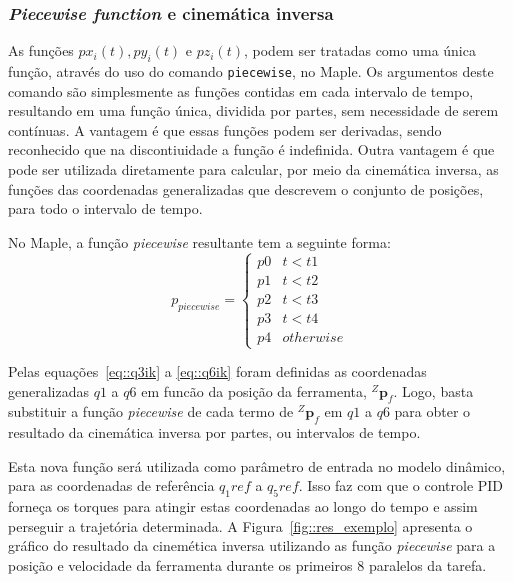 \subsubsection{\textit{Piecewise function} e cinemática inversa}

As funções $px_i(t), py_i(t)$ e $pz_i(t)$, podem ser tratadas como uma única
função, através do uso do comando \texttt{piecewise}, no Maple. Os argumentos
deste comando são simplesmente as funções contidas em cada intervalo de tempo,
resultando em uma função única, dividida por partes, sem necessidade de serem
contínuas. A vantagem é que essas funções podem ser derivadas, sendo reconhecido
que na discontiuidade a função é indefinida.
Outra vantagem é que pode ser utilizada diretamente para calcular, por meio da
cinemática inversa, as funções das coordenadas generalizadas que descrevem o
conjunto de posições, para todo o intervalo de tempo.

No Maple, a função \textit{piecewise} resultante tem a seguinte forma:
%
\begin{equation}
p_{piecewise} = 
\begin{cases}
p0 & t<t1 \\
p1 & t<t2 \\
p2 & t<t3 \\
p3 & t<t4 \\
p4 & otherwise
\end{cases}
\end{equation}
%

Pelas equações~\ref{eq::q3ik} a \ref{eq::q6ik} foram definidas as coordenadas
generalizadas $q1$ a $q6$ em funcão da posição da ferramenta, $^Z\mathbf{p}_f$.
Logo, basta substituir a função \textit{piecewise} de cada termo de
$^Z\mathbf{p}_f$ em $q1$ a $q6$ para obter o resultado da cinemática inversa por
partes, ou intervalos de tempo.

Esta nova função será utilizada como parâmetro de entrada no modelo dinâmico,
para as coordenadas de referência $q_1ref$ a $q_5ref$. Isso faz com que o
controle PID forneça os torques para atingir estas coordenadas ao
longo do tempo e assim perseguir a trajetória determinada. A
Figura~\ref{fig::res_exemplo} apresenta o gráfico do resultado da cinemética
inversa utilizando as função \textit{piecewise} para a posição e velocidade da
ferramenta durante os primeiros 8 paralelos da tarefa. 


